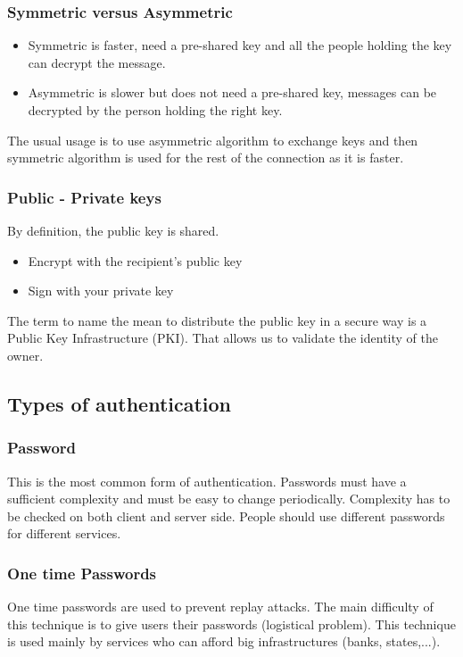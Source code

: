 \subsubsection{Symmetric versus Asymmetric}
\begin{itemize}
\item Symmetric 
is faster, need a pre-shared key and all the people holding the key can decrypt the message.
\item Asymmetric is slower but does not need a pre-shared key, messages can be decrypted by the person holding the right key.
\end{itemize}
The usual usage is to use asymmetric algorithm to exchange keys and then symmetric algorithm is used for the rest of the connection as it is faster.
\subsubsection{Public - Private keys}
By definition, the public key is shared. 
\begin{itemize}
\item Encrypt with the recipient's public key
\item Sign with your private key
\end{itemize}
The term to name the mean to distribute the public key in a secure way is a Public Key Infrastructure (PKI). That allows us to validate the identity of the owner.
\subsection{Types of authentication}
\subsubsection{Password}
This is the most common form of authentication.
Passwords must have a sufficient complexity and must be easy to change periodically.
Complexity has to be checked on both client and server side.
People should use different passwords for different services.
\subsubsection{One time Passwords}
One time passwords are used to prevent replay attacks. 
The main difficulty of this technique is to give users their passwords (logistical problem). 
This technique is used mainly by services who can afford big infrastructures (banks, states,...).
